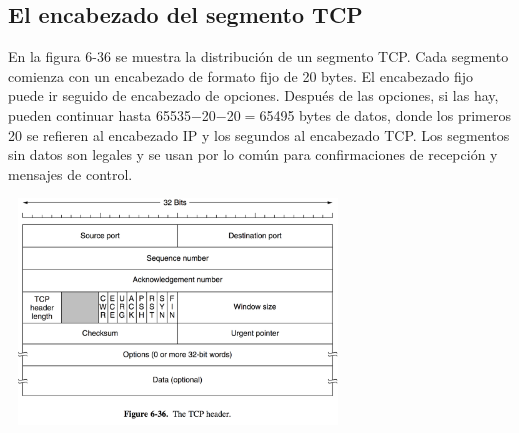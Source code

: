 \documentclass[10pt,a4paper]{report}
\begin{document}
\subsection{El encabezado del segmento TCP}
\par En la figura 6-36 se muestra la distribución de un segmento TCP. Cada segmento 
comienza con un encabezado de formato fijo de 20 bytes. El encabezado fijo puede ir 
seguido de encabezado de opciones. Después de las opciones, si las hay, pueden 
continuar hasta 65535$-$20$-$20$=$65495 bytes de datos, donde los primeros 20 se 
refieren al encabezado IP y los segundos al encabezado TCP. Los segmentos sin datos 
son legales y se usan por lo común para confirmaciones de recepción y mensajes de 
control.

	\begin{center}
	\includegraphics[width=9cm, height=6cm]{./imagenes/encabezado.png} 
	\end{center}
\end{document}
